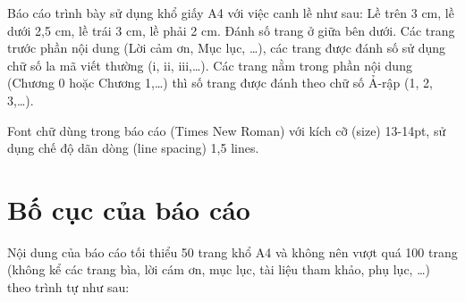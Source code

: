  Báo cáo trình bày sử dụng khổ giấy A4 với việc canh lề như sau: Lề trên 3 cm, lề dưới 2,5 cm, lề trái 3 cm, lề phải 2 cm. Đánh số trang ở giữa bên dưới. Các trang trước phần nội dung (Lời cảm ơn, Mục lục, \ldots), các trang được đánh số sử dụng chữ số la mã viết thường (i, ii, iii,\ldots). Các trang nằm trong phần nội dung (Chương 0 hoặc Chương 1,\ldots) thì số trang được đánh theo chữ số Ả-rập (1, 2, 3,\ldots).

Font chữ dùng trong báo cáo (Times New Roman) với kích cỡ (size) 13-14pt, sử dụng chế độ dãn dòng (line spacing) 1,5 lines.



\section{Bố cục của báo cáo}

Nội dung của báo cáo tối thiểu 50 trang khổ A4 và không nên vượt quá 100 trang (không kể các trang bìa, lời cám ơn, mục lục, tài liệu tham khảo, phụ lục, \ldots) theo trình tự như sau:


